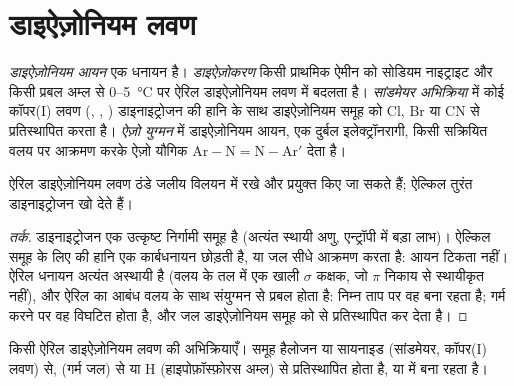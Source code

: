 \section{डाइऐज़ोनियम लवण}

\begin{definition}[डाइऐज़ोनियम रसायन]\label{def:b2:amines:diazonium}
\emph{डाइऐज़ोनियम आयन} एक धनायन  है। \emph{डाइऐज़ोकरण}
किसी प्राथमिक  ऐमीन को सोडियम नाइट्राइट और किसी प्रबल अम्ल से
0--\qty{5}{\degreeCelsius} पर ऐरिल डाइऐज़ोनियम लवण में बदलता है। \emph{सांडमेयर अभिक्रिया} में कोई कॉपर(I) लवण
(, , ) डाइनाइट्रोजन की हानि के साथ डाइऐज़ोनियम समूह को Cl, Br या CN से
प्रतिस्थापित करता है। \emph{ऐज़ो युग्मन} में डाइऐज़ोनियम आयन, एक दुर्बल इलेक्ट्रॉनरागी,
किसी सक्रियित  वलय पर आक्रमण करके ऐज़ो यौगिक $\mathrm{Ar{-}N{=}N{-}Ar'}$ देता है।
\end{definition}

\begin{proposition}\label{prop:b2:amines:diazonium}
ऐरिल डाइऐज़ोनियम लवण ठंडे जलीय विलयन में रखे और प्रयुक्त किए जा सकते हैं; ऐल्किल 
तुरंत डाइनाइट्रोजन खो देते हैं।
\end{proposition}

\begin{proof}[तर्क]
डाइनाइट्रोजन एक उत्कृष्ट निर्गामी समूह है (अत्यंत स्थायी अणु, एन्ट्रॉपी में बड़ा लाभ)।
ऐल्किल समूह के लिए  की हानि एक कार्बधनायन छोड़ती है, या जल सीधे आक्रमण करता है: आयन
टिकता नहीं। ऐरिल धनायन अत्यंत अस्थायी है (वलय के तल में एक खाली $\sigma$ कक्षक,
जो $\pi$ निकाय से स्थायीकृत नहीं), और ऐरिल  का  आबंध
वलय के साथ संयुग्मन से प्रबल होता है: निम्न ताप पर वह बना रहता है; गर्म करने पर वह विघटित होता है,
और जल डाइऐज़ोनियम समूह को  से प्रतिस्थापित कर देता है।
\end{proof}

\begin{omfigure}

{\small किसी ऐरिल डाइऐज़ोनियम लवण की अभिक्रियाएँ।  समूह हैलोजन या
सायनाइड (सांडमेयर, कॉपर(I) लवण) से,  (गर्म जल) से या H (हाइपोफ़ॉस्फ़ोरस अम्ल) से प्रतिस्थापित होता है, या
 में बना रहता है।}
\end{omfigure}

